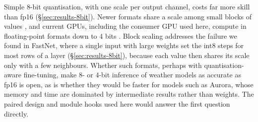 Simple 8-bit quantisation, with one scale per output channel,
costs far more skill than fp16 (\S\ref{sec:results-8bit}). Newer formats
share a scale among small blocks of values \citep{rouhani2023microscaling},
and current GPUs, including the consumer GPU used here, compute in
floating-point formats down to 4 bits \citep{nvidia2025rtx50}. Block
scaling addresses the failure we found in FastNet, where a single input
with large weights set the int8 steps for most rows of a layer
(\S\ref{sec:results-8bit}), because each value then shares its scale only
with a few neighbours. Whether such formats, perhaps with quantisation-aware
fine-tuning, make 8- or 4-bit inference of weather models as accurate as
fp16 is open, as is whether they would be faster for models such as
Aurora, whose memory and time are dominated by intermediate results
rather than weights. The paired
design and module hooks used here would answer the first question
directly.
